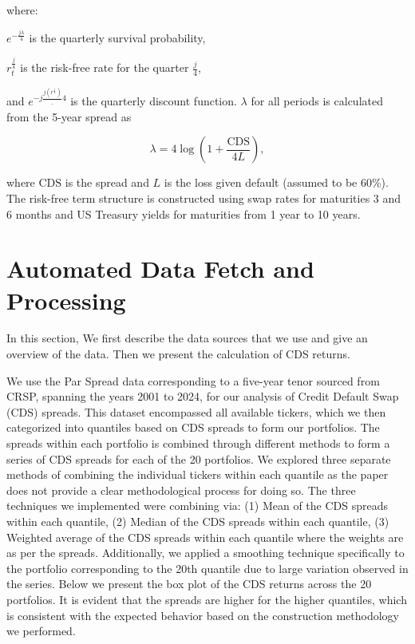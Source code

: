 \documentclass{article}
\begin{document}
where:\


$e^{-\frac{j\lambda}{4}}$ is the quarterly survival probability, \ 

$r^{\frac{j}{4}}_t$ is the risk-free rate for the quarter $\frac{j}{4}$,\

and $e^{-j\frac{j(r^{\frac{j}{4}})}_{4}}$ is the quarterly discount function.  $\lambda$ for all periods is calculated from the 5-year spread as

\[
\lambda = 4 \log \left(1 + \frac{\text{CDS}}{4L}\right),
\]

where $\text{CDS}$ is the spread and $L$ is the loss given default (assumed to be 60\%). The risk-free term structure is constructed using swap rates for maturities 3 and 6 months and US Treasury yields for maturities from 1 year to 10 years.


\section{Automated Data Fetch and Processing}
In this section, We first describe the data sources that we use and give an overview of the data. Then we present the calculation of CDS returns.


We use the Par Spread data corresponding to a five-year tenor sourced from CRSP, spanning the years 2001 to 2024, for our analysis of Credit Default Swap (CDS) spreads. This dataset encompassed all available tickers, which we then categorized into quantiles based on CDS spreads to form our portfolios. The spreads within each portfolio is combined through different methods to form a series of CDS spreads for each of the 20 portfolios. We explored three separate methods of combining the individual tickers within each quantile as the paper does not provide a clear methodological process for doing so. The three techniques we implemented were combining via: (1) Mean of the CDS spreads within each quantile, (2) Median of the CDS spreads within each quantile, (3) Weighted average of the CDS spreads within each quantile where the weights are as per the spreads. Additionally, we applied a smoothing technique specifically to the portfolio corresponding to the 20th quantile due to large variation observed in the series. Below we present the box plot of the CDS returns across the 20 portfolios. It is evident that the spreads are higher for the higher quantiles, which is consistent with the expected behavior based on the construction methodology we performed.

\end{document}
